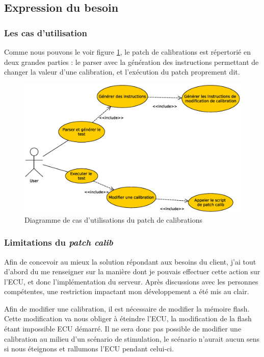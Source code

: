 \subsection{Expression du besoin}\label{besoin-patch}
\subsubsection{Les cas d'utilisation}
		Comme nous pouvons le voir figure \ref{fig:patch-cal-usecase}, le patch de calibrations est répertorié en deux grandes parties : le parser avec la génération des instructions permettant de changer la valeur d'une calibration, et l'exécution du patch proprement dit.
		\begin{figure}[H]
			\centering
			\includegraphics[width=12cm]{contents/images/patch-cal_usecase.eps}
			\caption{Diagramme de cas d'utilisations du patch de calibrations}
			\label{fig:patch-cal-usecase}
		\end{figure}

		\subsubsection{Limitations du \textit{patch calib}}\label{ecustop}
		Afin de concevoir au mieux la solution répondant aux besoins du client, j'ai tout d'abord du me renseigner sur la manière dont je pouvais effectuer cette action sur l'ECU, et donc l'implémentation du serveur. Après discussions avec les personnes compétentes, une restriction impactant mon développement a été mis au clair.
		
		Afin de modifier une calibration, il est nécessaire de modifier la mémoire flash. Cette modification va nous obliger à éteindre l'ECU, la modification de la flash étant impossible ECU démarré. Il ne sera donc pas possible de modifier une calibration au milieu d'un scénario de stimulation, le scénario n'aurait aucun sens si nous éteignons et rallumons l'ECU pendant celui-ci.
		
